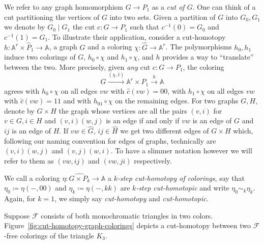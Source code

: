 \documentclass[oneside]{amsart}
\newcommand{\str}[1]{\mathbb{#1}}
\newcommand{\cat}[1]{\mathcal{#1}}
\begin{document}
We refer to any graph homomorphism $G \to P_1$ as a \emph{cut of $G$}.
One can think of a cut partitioning the vertices of $G$ into two sets. Given a partition of $G$ into $G_0,G_1$ we denote by $G_0\mid G_1$ the cut $c: G \to P_1$ such that $c^{-1}(0) = G_0$ and $c^{-1}(1) = G_1$.
To illustrate their application, consider a cut-homotopy $h \colon \str A^r \times \hat P_1 \to \str A$, a graph $G$ and a coloring $\chi \colon \hat G \to \str A^r$. The polymorphisms $h_{0}, h_{1}$ induce two colorings of $G$, $h_{0}\circ \chi$ and $h_{1}\circ \chi$, and $h$ provides a way to ``translate'' between the two. More precisely, given \emph{any} cut $c \colon G \to P_1$, the coloring
\begin{equation*}
    \hat G\xrightarrow{(\chi,\hat c)} \str A^r\times\hat P_1\xrightarrow{h} \str A
\end{equation*} 
agrees with $h_0\circ \chi$ on all edges $vw$ with $\hat c(vw) = 00$, with $h_1 \circ \chi$ on all edges $vw$ with $\hat c(vw) = 11$ and with $h_{01}\circ \chi$ on the remaining edges.
For two graphs $G,H$, denote by $G\times H$ the graph whose vertices are all the pairs $(v,i)$ for $v\in G, i\in H$ and $(v,i)(w,j)$ is an edge if and only if $vw$ is an edge of $G$ and $ij$ is an edge of $H$.
If $vw \in \hat G$, $ij \in \hat H$ we get two different edges of $G \times H$ which, following our naming convention for edges of graphs, technically are $(v,i)(w,j)$ and $(v,j)(w,i)$. 
To have a slimmer notation however we will refer to them as $(vw,ij)$ and $(vw,ji)$ respectively.
\begin{definition}
We call a coloring $\eta\colon\widehat{G\times P_k}\to \str A$ a $k$\emph{-step cut-homotopy of colorings}, say that $\eta_0\coloneq\eta(- ,00)$ and $\eta_k\coloneq\eta(-,kk)$ are $k$\emph{-step cut-homotopic} and write $\eta_0\sim_k \eta_k$.
Again, for $k=1$, we simply say \emph{cut-homotopy} and \emph{cut-homotopic}.
\end{definition}
\begin{exam}
Suppose $\cat F$ consists of both monochromatic triangles in two colors. Figure~\ref{fig:cut-homotopy-graph-colorings} depicts a cut-homotopy between two $\cat F$-free colorings of the triangle $K_3$.
\end{exam}
\end{document}
